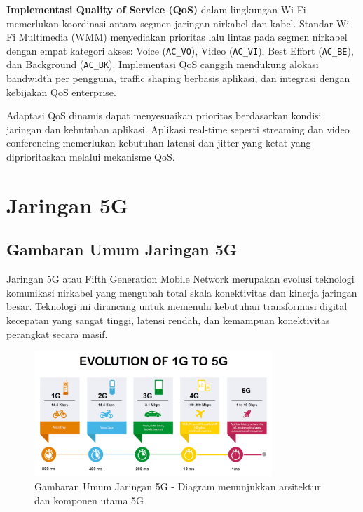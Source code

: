 \textbf{Implementasi Quality of Service (QoS)} dalam lingkungan Wi-Fi memerlukan koordinasi antara segmen jaringan nirkabel dan kabel. Standar Wi-Fi Multimedia (WMM) menyediakan prioritas lalu lintas pada segmen nirkabel dengan empat kategori akses: Voice (\texttt{AC\_VO}), Video (\texttt{AC\_VI}), Best Effort (\texttt{AC\_BE}), dan Background (\texttt{AC\_BK}). Implementasi QoS canggih mendukung alokasi bandwidth per pengguna, traffic shaping berbasis aplikasi, dan integrasi dengan kebijakan QoS enterprise.

Adaptasi QoS dinamis dapat menyesuaikan prioritas berdasarkan kondisi jaringan dan kebutuhan aplikasi. Aplikasi real-time seperti streaming dan video conferencing memerlukan kebutuhan latensi dan jitter yang ketat yang diprioritaskan melalui mekanisme QoS.

\section{Jaringan 5G}

\subsection{Gambaran Umum Jaringan 5G}

Jaringan 5G atau Fifth Generation Mobile Network merupakan evolusi teknologi komunikasi nirkabel yang mengubah total skala konektivitas dan kinerja jaringan besar. Teknologi ini dirancang untuk memenuhi kebutuhan transformasi digital kecepatan yang sangat tinggi, latensi rendah, dan kemampuan konektivitas perangkat secara masif.

\begin{figure}[htbp]
    \centering
    \includegraphics[width=0.8\textwidth]{assets/pics/bab3_6.png}
    \caption{Gambaran Umum Jaringan 5G - Diagram menunjukkan arsitektur dan komponen utama 5G}
    \label{fig:5g_overview}
\end{figure}

